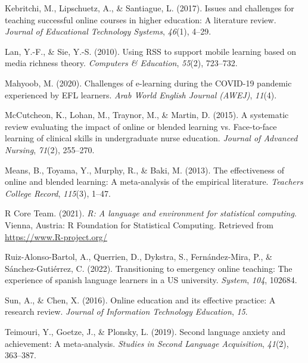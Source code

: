 \documentclass[
  man]{apa6}
\newlength{\cslhangindent}
\newlength{\cslentryspacingunit} %
\newenvironment{CSLReferences}[2] %
 {%
  \setlength{\parindent}{0pt}
  \ifodd #1
  \let\oldpar\par
  \def\par{\hangindent=\cslhangindent\oldpar}
  \fi
  \setlength{\parskip}{#2\cslentryspacingunit}
 }%
 {}
\begin{document}
\begin{CSLReferences}{1}{0}
\leavevmode{}%
Kebritchi, M., Lipschuetz, A., \& Santiague, L. (2017). Issues and challenges for teaching successful online courses in higher education: A literature review. \emph{Journal of Educational Technology Systems}, \emph{46}(1), 4--29.

\leavevmode{}%
Lan, Y.-F., \& Sie, Y.-S. (2010). Using RSS to support mobile learning based on media richness theory. \emph{Computers \& Education}, \emph{55}(2), 723--732.

\leavevmode{}%
Mahyoob, M. (2020). Challenges of e-learning during the COVID-19 pandemic experienced by EFL learners. \emph{Arab World English Journal (AWEJ)}, \emph{11}(4).

\leavevmode{}%
McCutcheon, K., Lohan, M., Traynor, M., \& Martin, D. (2015). A systematic review evaluating the impact of online or blended learning vs. Face-to-face learning of clinical skills in undergraduate nurse education. \emph{Journal of Advanced Nursing}, \emph{71}(2), 255--270.

\leavevmode{}%
Means, B., Toyama, Y., Murphy, R., \& Baki, M. (2013). The effectiveness of online and blended learning: A meta-analysis of the empirical literature. \emph{Teachers College Record}, \emph{115}(3), 1--47.

\leavevmode{}%
R Core Team. (2021). \emph{R: A language and environment for statistical computing}. Vienna, Austria: R Foundation for Statistical Computing. Retrieved from \url{https://www.R-project.org/}

\leavevmode{}%
Ruiz-Alonso-Bartol, A., Querrien, D., Dykstra, S., Fernández-Mira, P., \& Sánchez-Gutiérrez, C. (2022). Transitioning to emergency online teaching: The experience of spanish language learners in a US university. \emph{System}, \emph{104}, 102684.

\leavevmode{}%
Sun, A., \& Chen, X. (2016). Online education and its effective practice: A research review. \emph{Journal of Information Technology Education}, \emph{15}.

\leavevmode{}%
Teimouri, Y., Goetze, J., \& Plonsky, L. (2019). Second language anxiety and achievement: A meta-analysis. \emph{Studies in Second Language Acquisition}, \emph{41}(2), 363--387.


\end{CSLReferences}
\end{document}
